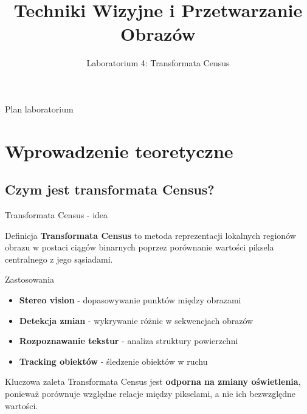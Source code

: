 \documentclass[9pt]{beamer}
\title[Transformata Census]{Techniki Wizyjne i Przetwarzanie Obrazów}
\subtitle{Laboratorium 4: Transformata Census}
\begin{document}
	
\begin{frame}[plain]
\titlepage
{}
\end{frame}

\begin{frame}[allowframebreaks]{Plan laboratorium}
\tableofcontents[hideallsubsections]
\end{frame}

\section{Wprowadzenie teoretyczne}

\subsection{Czym jest transformata Census?}

\begin{frame}{Transformata Census - idea}
\begin{block}{Definicja}
\textbf{Transformata Census} to metoda reprezentacji lokalnych regionów obrazu w postaci ciągów binarnych poprzez porównanie wartości piksela centralnego z jego sąsiadami.
\end{block}

\pause

\begin{block}{Zastosowania}
\begin{itemize}
\item \textbf{Stereo vision} - dopasowywanie punktów między obrazami
\item \textbf{Detekcja zmian} - wykrywanie różnic w sekwencjach obrazów
\item \textbf{Rozpoznawanie tekstur} - analiza struktury powierzchni
\item \textbf{Tracking obiektów} - śledzenie obiektów w ruchu
\end{itemize}
\end{block}

\pause

\begin{alertblock}{Kluczowa zaleta}
Transformata Census jest \textbf{odporna na zmiany oświetlenia}, ponieważ porównuje względne relacje między pikselami, a nie ich bezwzględne wartości.
\end{alertblock}

\end{frame}
\end{document}
